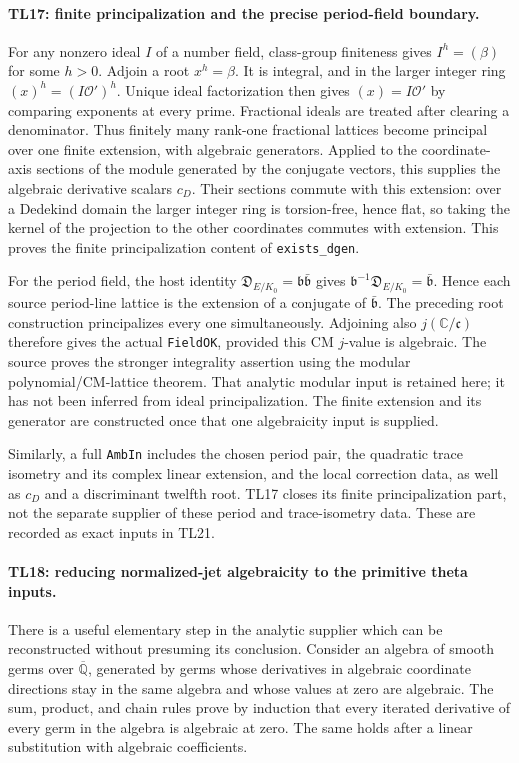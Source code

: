 \documentclass[11pt,a4paper]{article}
\numberwithin{equation}{section}
\theoremstyle{remark}\newtheorem{remark}[theorem]{Remark}
\begin{document}
\paragraph{TL17: finite principalization and the precise period-field
boundary.}
For any nonzero ideal $I$ of a number field, class-group finiteness
gives $I^h=(\beta)$ for some $h>0$. Adjoin a root $x^h=\beta$.
It is integral, and in the larger integer ring
$(x)^h=(I\mathcal O')^h$. Unique ideal factorization then gives
$(x)=I\mathcal O'$ by comparing exponents at every prime.
Fractional ideals are treated after clearing a denominator.
Thus finitely many rank-one fractional lattices become principal
over one finite extension, with algebraic generators. Applied to
the coordinate-axis sections of the module generated by the
conjugate vectors, this supplies the algebraic derivative scalars
$c_D$. Their sections commute with this extension: over a
Dedekind domain the larger integer ring is torsion-free, hence
flat, so taking the kernel of the projection to the other
coordinates commutes with extension. This proves the finite
principalization content of \texttt{exists\_\allowbreak dgen}.

For the period field, the host identity
$\mathfrak D_{E/K_0}=\mathfrak b\bar{\mathfrak b}$ gives
$\mathfrak b^{-1}\mathfrak D_{E/K_0}=\bar{\mathfrak b}$.
Hence each source period-line lattice is the extension of a
conjugate of $\bar{\mathfrak b}$. The preceding root construction
principalizes every one simultaneously. Adjoining also
$j(\mathbb C/\mathfrak c)$ therefore gives the actual
\texttt{FieldOK}, provided this CM $j$-value is algebraic.
The source proves the stronger integrality assertion using the
modular polynomial/CM-lattice theorem. That analytic modular
input is retained here; it has not been inferred from ideal
principalization. The finite extension and its generator are
constructed once that one algebraicity input is supplied.

Similarly, a full \texttt{AmbIn} includes the chosen period pair,
the quadratic trace isometry and its complex linear extension,
and the local correction data, as well as $c_D$ and a discriminant
twelfth root. TL17 closes its finite principalization part, not
the separate supplier of these period and trace-isometry data.
These are recorded as exact inputs in TL21.

\paragraph{TL18: reducing normalized-jet algebraicity to the primitive
theta inputs.}
There is a useful elementary step in the analytic supplier which
can be reconstructed without presuming its conclusion. Consider
an algebra of smooth germs over $\overline{\mathbb Q}$, generated
by germs whose derivatives in algebraic coordinate directions
stay in the same algebra and whose values at zero are algebraic.
The sum, product, and chain rules prove by induction that every
iterated derivative of every germ in the algebra is algebraic
at zero. The same holds after a linear substitution with algebraic
coefficients.
\end{document}
